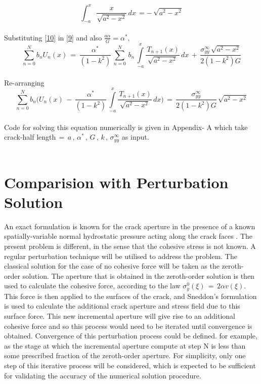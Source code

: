 \documentclass[authoryear,12pt]{elsarticle}
\begin{document}
		\begin{equation}\label{10}
			\int_{-a}^x \frac{x}{\sqrt{a^2-x^2}}\,dx\,=-\,\sqrt{a^2-x^2}
		\end{equation}
		\\
		Substituting \cref{10} in \cref{9} and also \(\frac{a\alpha}{G} = \alpha^*\),
		\begin{equation*}
			\sum_{n=0}^{N} b_n U_n(x)\,=\,\frac{\alpha^*}{(1-k^2)}\,\sum_{n=0}^{N}\,b_n\,\int\limits_{-a}^x\frac{\, T_{n+1}(x)}{\sqrt{a^2 - x^2}}\,dx \,+\,\frac{\sigma^{\infty}_{yy}\,\sqrt{a^2-x^2}}{2(1-k^2)G}
		\end{equation*}
		\\
		Re-arranging
		\begin{equation}\label{11}
			\boxed{\sum_{n=0}^{N} b_n \bigg(U_n(x)\,-\,\frac{\alpha^*}{(1-k^2)}\,\int\limits_{-a}^x\frac{\, T_{n+1}(x)}{\sqrt{a^2 - x^2}}\,dx\bigg)\,=\,\frac{\sigma^{\infty}_{yy}}{2(1-k^2)G}\,\sqrt{a^2-x^2}}
		\end{equation}
		\\
		Code for solving this equation numerically is given in Appendix- A which take crack-half length\(\,=\,a\, , \,\alpha^*\, , \,G\, , \,k\, , \,\sigma^{\infty}_{yy}\) as input.
	\\
	\\
	\section{Comparision with Perturbation Solution}
	An exact formulation is known for the crack aperture in the presence of a known spatially-variable normal hydrostatic pressure acting along the crack faces \citep{sneddon1969crack}. The present problem is different, in the sense that the cohesive stress is not known. A regular perturbation technique \citep{hinch1991perturbation} will be utilised to address the problem. The classical solution for the case of no cohesive force will be taken as the zeroth-order solution. The aperture that is obtained in the zeroth-order solution is then used to calculate the cohesive force, according to the law \(\sigma_y^0(\xi)\,=\,2\alpha v(\xi)\). This force is then applied to the surfaces of the crack, and Sneddon's formulation is used to calculate the additional crack aperture and stress field due to this surface force. This new incremental aperture will give rise to an additional cohesive force and so this process would need to be iterated until convergence is obtained. Convergence of this perturbation process could be defined. for example, as the stage at which the incremental aperture compute at step N is less than some prescribed fraction of the zeroth-order aperture. For simplicity, only one step of this iterative process will be considered, which is expected to be sufficient for validating the accuracy of the numerical solution procedure.
	
\end{document}
